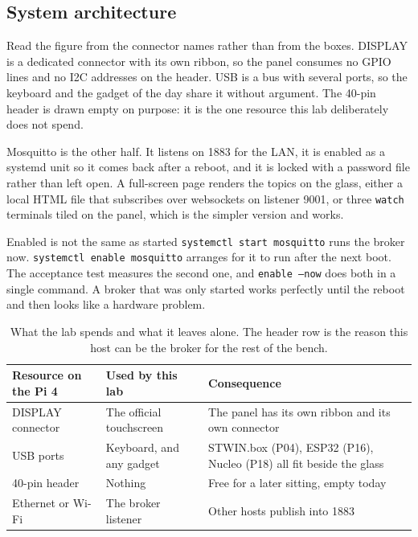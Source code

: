 \subsection*{System architecture}


Read the figure from the connector names rather than from the boxes. DISPLAY is a dedicated connector with its own ribbon, so the panel consumes no GPIO lines and no I2C addresses on the header. USB is a bus with several ports, so the keyboard and the gadget of the day share it without argument. The 40-pin header is drawn empty on purpose: it is the one resource this lab deliberately does not spend.

Mosquitto is the other half. It listens on 1883 for the LAN, it is enabled as a systemd unit so it comes back after a reboot, and it is locked with a password file rather than left open. A full-screen page renders the topics on the glass, either a local HTML file that subscribes over websockets on listener 9001, or three \texttt{watch} terminals tiled on the panel, which is the simpler version and works.

\begin{note}{Enabled is not the same as started}
\texttt{systemctl start mosquitto} runs the broker now. \texttt{systemctl enable mosquitto} arranges for it to run after the next boot. The acceptance test measures the second one, and \texttt{enable --now} does both in a single command. A broker that was only started works perfectly until the reboot and then looks like a hardware problem.
\end{note}

\begin{table}[H]\centering\small
\begin{tabular}{p{40mm}p{34mm}p{78mm}}
\toprule
Resource on the Pi 4 & Used by this lab & Consequence \\
\midrule
DISPLAY connector & The official touchscreen & The panel has its own ribbon and its own connector \\
USB ports & Keyboard, and any gadget & STWIN.box (P04), ESP32 (P16), Nucleo (P18) all fit beside the glass \\
40-pin header & Nothing & Free for a later sitting, empty today \\
Ethernet or Wi-Fi & The broker listener & Other hosts publish into 1883 \\
\bottomrule
\end{tabular}
\caption{What the lab spends and what it leaves alone. The header row is the reason this host can be the broker for the rest of the bench.}
\end{table}

